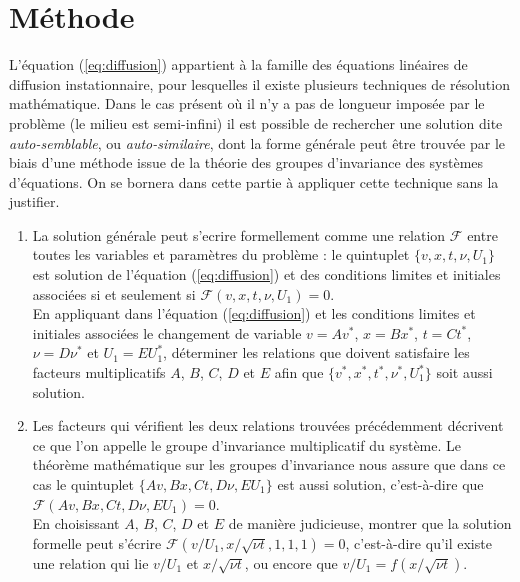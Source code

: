 \documentclass[10pt, a4paper]{article}
\begin{document}
\section{Méthode}

L'équation (\ref{eq:diffusion}) appartient à la famille des équations linéaires de diffusion 
instationnaire, pour lesquelles il existe plusieurs techniques de résolution mathématique.
Dans le cas présent où il n'y a pas de longueur imposée par le problème (le milieu est semi-infini)
il est possible de rechercher une solution dite \textsl{auto-semblable}, ou \textsl{auto-similaire},
dont la forme générale peut être trouvée
par le biais d'une méthode issue de la théorie des groupes d'invariance des systèmes d'équations.
On se bornera dans cette partie à appliquer cette technique sans la justifier.

\begin{enumerate}
\item
La solution générale peut s'ecrire formellement comme une relation $\mathcal{F}$
entre toutes les variables et paramètres du problème : 
le quintuplet $\{v, x, t, \nu, U_1\}$ est solution de l'équation (\ref{eq:diffusion})
et des conditions limites et initiales associées
si et seulement si $\mathcal{F}(v, x, t, \nu, U_1)=0$.
\\
En appliquant dans l'équation (\ref{eq:diffusion}) et les conditions limites et initiales associées
le changement de variable $v=Av^*$, $x=Bx^*$, $t=Ct^*$, $\nu=D\nu^*$ et $U_1=EU_1^*$,
déterminer les relations que doivent satisfaire les facteurs multiplicatifs 
$A$, $B$, $C$, $D$ et $E$ afin que $\{v^*, x^*, t^*, \nu^*, U_1^*\}$ soit aussi solution.
\item
Les facteurs qui vérifient les deux relations trouvées précédemment décrivent ce que l'on appelle
le groupe d'invariance multiplicatif du système.
Le théorème mathématique sur les groupes d'invariance nous assure que dans ce cas
le quintuplet $\{Av, Bx, Ct, D\nu, EU_1\}$ est aussi solution, c'est-à-dire que
$\mathcal{F}(Av, Bx, Ct, D\nu, EU_1)=0$.
\\
En choisissant $A$, $B$, $C$, $D$ et $E$ de manière judicieuse, montrer que la solution
formelle peut s'écrire $\mathcal{F}(v/U_1, x/\sqrt{\nu t}, 1, 1, 1)=0$, c'est-à-dire 
qu'il existe une relation qui lie $v/U_1$ et $x/\sqrt{\nu t}$, ou encore 
que $v/U_1 = f(x/\sqrt{\nu t})$.
\end{enumerate}
\end{document}
